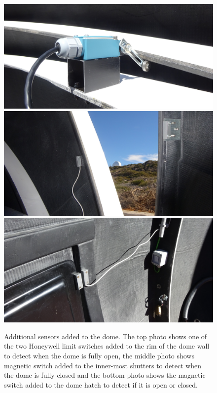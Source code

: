 \begin{colsection}
\begin{figure}[p]
    \begin{center}
        \includegraphics[width=0.8\linewidth]{images/dome_sensor_1.jpg}
        \includegraphics[width=0.8\linewidth]{images/dome_sensor_2.jpg}
        \includegraphics[width=0.8\linewidth]{images/dome_sensor_3.jpg}
    \end{center}
    \caption[Additional sensors added to the dome]{
        Additional sensors added to the dome. The top photo shows one of the two Honeywell limit switches added to the rim of the dome wall to detect when the dome is fully open, the middle photo shows magnetic switch added to the inner-most shutters to detect when the dome is fully closed and the bottom photo shows the magnetic switch added to the dome hatch to detect if it is open or closed.
    }\label{fig:dome_switches}
\end{figure}


\end{colsection}
